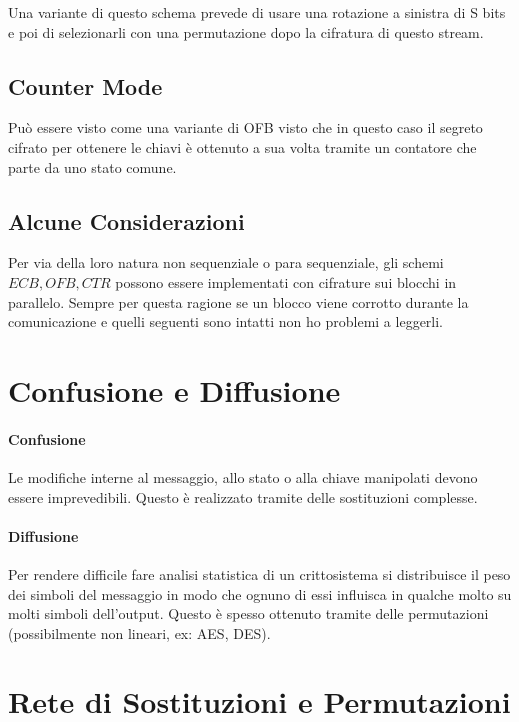 Una variante di questo schema prevede di usare una rotazione a sinistra di S bits e poi di selezionarli con una permutazione dopo la cifratura di questo stream.

\subsection{Counter Mode}

Pu\`o essere visto come una variante di OFB visto che in questo caso il segreto cifrato per ottenere le chiavi \`e ottenuto a sua volta tramite un contatore che parte da uno stato comune.


\subsection{Alcune Considerazioni}

Per via della loro natura non sequenziale o para sequenziale, gli schemi $ECB, OFB, CTR$ possono essere implementati con cifrature sui blocchi in parallelo.
Sempre per questa ragione se un blocco viene corrotto durante la comunicazione e quelli seguenti sono intatti non ho problemi a leggerli.

\section{Confusione e Diffusione}

\paragraph{Confusione}

Le modifiche interne al messaggio, allo stato o alla chiave manipolati devono essere imprevedibili. Questo \`e realizzato tramite delle sostituzioni complesse.

\paragraph{Diffusione}

Per rendere difficile fare analisi statistica di un crittosistema si distribuisce il peso dei simboli del messaggio in modo che ognuno di essi influisca in qualche molto su molti simboli dell'output. Questo \`e spesso ottenuto tramite delle permutazioni (possibilmente non lineari, ex: AES, DES).

\section{Rete di Sostituzioni e Permutazioni}

